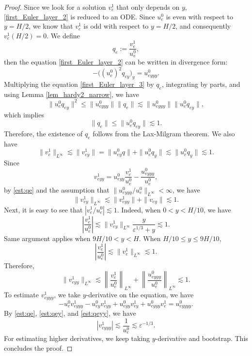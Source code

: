 \documentclass[reqno, 11pt]{amsart}
\theoremstyle{plain}
\theoremstyle{definition}
\theoremstyle{remark}
\numberwithin{equation}{section}
\begin{document}
\begin{proof}
Since we look for a solution $v_e^1$ that only depends on $y$, \eqref{first_Euler_layer_2} is reduced to an ODE. Since $u_e^0$ is even with respect to $y = H/2$, we know that $v_e^1$ is odd with respect to $y = H/2$, and consequently $v_e^1(H/2) = 0$. We define
$$
q_e := \frac{v_e^1}{u_e^0},
$$
then the equation \eqref{first_Euler_layer_2} can be written in divergence form:
\begin{equation}\label{first_Euler_layer_3}
- \Big( (u_e^0)^2 q_{ey} \Big)_y = u_{eyyy}^0.
\end{equation}
Multiplying the equation \eqref{first_Euler_layer_3} by $q_e$, integrating by parts, and using Lemma \ref{lem_hardy2_narrow}, we have
$$
\| u_e^0 q_{ey}\|^2 \le \|u_{eyyy}^0\| \|q_e\| \lesssim \|u_{eyyy}^0\| \| u_e^0 q_{ey}\|,
$$ 
which implies
\begin{equation}\label{est:qe}
\|q_e\| \le \| u_e^0 q_{ey}\| \lesssim 1.
\end{equation}
Therefore, the existence of $q_e$ follows from the Lax-Milgram theorem. We also have
$$
\| v_e^1 \|_{L^\infty} \lesssim \|v_{ey}^1\| = \| u_{ey}^0 q\| + \|u_e^0 q_y\| \lesssim \|u_e^0 q_y\| \lesssim 1.
$$
Since
$$
v_{eyy}^1 = u_{eyy}^0 \frac{v_e^1}{u_e^0} - \frac{u_{eyyy}^0}{u_e^0},
$$
by \eqref{est:qe} and the assumption that $\|u_{eyyy}^0/u_e^0\|_{L^\infty} < \infty$, we have
\begin{equation}\label{est:qey}
\| v_{ey}^1 \|_{L^\infty} \lesssim \|v_{eyy}^1\| + \|v_{ey}\| \lesssim 1.
\end{equation}
Next, it is easy to see that $|v_e^1/u_e^0| \lesssim 1$. Indeed, when $0< y < H/10$, we have
$$
\left| \frac{v_e^1}{u_e^0} \right| \lesssim \| v_{ey}^1 \|_{L^\infty} \frac{y}{\varepsilon^{1/3}+ y} \lesssim 1.
$$
Same argument applies when $9H/10< y < H$. When $H/10 \le y \le 9H/10$,
$$
\left| \frac{v_e^1}{u_e^0} \right| \lesssim \| v_{e}^1 \|_{L^\infty} \lesssim 1.
$$
Therefore,
\begin{equation}\label{est:qeyy}
\| v_{eyy}^1 \|_{L^\infty} \lesssim \left\| \frac{v_e^1}{u_e^0} \right\|_{L^\infty} + \left\| \frac{u_{eyyy}^0}{u_e^0} \right\|_{L^\infty} \lesssim 1.
\end{equation}
To estimate $v_{eyyy}^1$, we take $y$-derivative on the equation, we have
$$
-u_e^0  v_{eyyy}^1 -u_{ey}^0  v_{eyy}^1 + u_{eyy}^0 v_{ey}^1 + u_{eyyy}^0 v_e^1 = u_{eyyyy}^0.
$$
By \eqref{est:qe}, \eqref{est:qey}, and \eqref{est:qeyy}, we have
$$
|v_{eyyy}^1| \lesssim \frac{1}{u_e^0} \lesssim \varepsilon^{-1/3}.
$$
For estimating higher derivatives, we keep taking $y$-derivative and bootstrap. This concludes the proof.
\end{proof}
\end{document}
